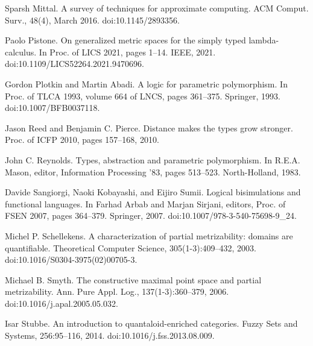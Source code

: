 \par\noindent  [28]  Sparsh Mittal.  A survey of techniques for approximate computing.  ACM Comput. Surv., 48(4), March 2016.  doi:10.1145/2893356.  
 
\par\noindent  [29]  Paolo Pistone.  On generalized metric spaces for the simply typed lambda-calculus.  In Proc. of LICS 2021, pages 1–14. IEEE, 2021.  doi:10.1109/LICS52264.2021.9470696.  
 
\par\noindent  [30]  Gordon Plotkin and Martin Abadi.  A logic for parametric polymorphism.  In Proc. of TLCA 1993, volume 664 of LNCS, pages 361–375. Springer, 1993.  doi:10.1007/BFB0037118.  
 
\par\noindent  [31]  Jason Reed and Benjamin C. Pierce.  Distance makes the types grow stronger.  Proc. of ICFP 2010, pages 157–168, 2010.  
 
\par\noindent  [32]  John C. Reynolds.  Types, abstraction and parametric polymorphism.  In R.E.A. Mason, editor, Information Processing ’83, pages 513–523. North-Holland, 1983.  
 
\par\noindent  [33]  Davide Sangiorgi, Naoki Kobayashi, and Eijiro Sumii.  Logical bisimulations and functional languages.  In Farhad Arbab and Marjan Sirjani, editors, Proc. of FSEN 2007, pages 364–379. Springer, 2007.  doi:10.1007/978-3-540-75698-9\_24.  
 
\par\noindent  [34]  Michel P. Schellekens.  A characterization of partial metrizability: domains are quantifiable.  Theoretical Computer Science, 305(1-3):409–432, 2003.  doi:10.1016/S0304-3975(02)00705-3.  
 
\par\noindent  [35]  Michael B. Smyth.  The constructive maximal point space and partial metrizability.  Ann. Pure Appl. Log., 137(1-3):360–379, 2006.  doi:10.1016/j.apal.2005.05.032.  
 
\par\noindent  [36]  Isar Stubbe.  An introduction to quantaloid-enriched categories.  Fuzzy Sets and Systems, 256:95–116, 2014.  doi:10.1016/j.fss.2013.08.009.  
  
